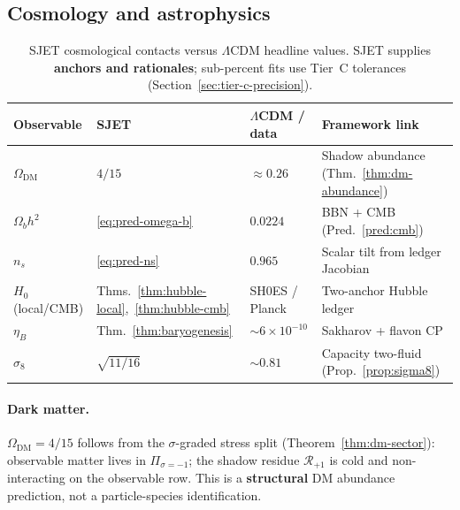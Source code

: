 \documentclass[11pt]{article}
\theoremstyle{plain}
\theoremstyle{definition}
\theoremstyle{remark}
\numberwithin{equation}{section}
\begin{document}
\subsection{Cosmology and astrophysics}
\label{sec:standard-theories:cosmo}

\begin{table}[ht]
\centering
\small
\renewcommand{\arraystretch}{1.14}
\begin{tabular}{@{}llll@{}}
\toprule
\textbf{Observable} & \textbf{SJET} & \textbf{$\Lambda$CDM / data} &
\textbf{Framework link} \\
\midrule
$\Omega_{\mathrm{DM}}$ &
  $4/15$ &
  $\approx 0.26$ &
  Shadow abundance (Thm.~\ref{thm:dm-abundance}) \\
$\Omega_b h^2$ &
  \eqref{eq:pred-omega-b} &
  $0.0224$ &
  BBN + CMB (Pred.~\ref{pred:cmb}) \\
$n_s$ &
  \eqref{eq:pred-ns} &
  $0.965$ &
  Scalar tilt from ledger Jacobian \\
$H_0$ (local/CMB) &
  Thms.~\ref{thm:hubble-local},~\ref{thm:hubble-cmb} &
  SH0ES / Planck &
  Two-anchor Hubble ledger \\
$\eta_B$ &
  Thm.~\ref{thm:baryogenesis} &
  $\sim 6\times 10^{-10}$ &
  Sakharov + flavon CP \\
$\sigma_8$ &
  $\sqrt{11/16}$ &
  $\sim 0.81$ &
  Capacity two-fluid (Prop.~\ref{prop:sigma8}) \\
\bottomrule
\end{tabular}
\caption{SJET cosmological contacts versus $\Lambda$CDM headline values.
SJET supplies \textbf{anchors and rationales}; sub-percent fits use Tier~C
tolerances (Section~\ref{sec:tier-c-precision}).}
\label{tab:cosmo-bridge}
\end{table}

\paragraph{Dark matter.}
$\Omega_{\mathrm{DM}}=4/15$ follows from the $\sigma$-graded stress split
(Theorem~\ref{thm:dm-sector}): observable matter lives in
$\Pi_{\sigma=-1}$; the shadow residue $\mathcal{R}_{+1}$ is cold and
non-interacting on the observable row. This is a \textbf{structural} DM
abundance prediction, not a particle-species identification.

\end{document}
